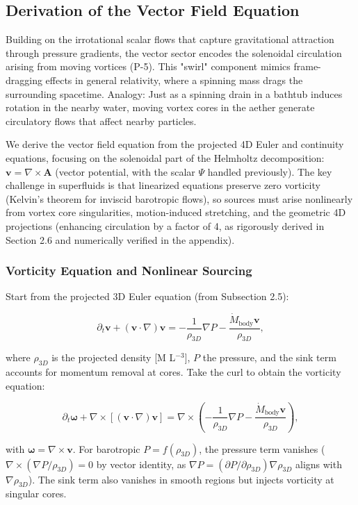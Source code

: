 \subsection{Derivation of the Vector Field Equation}

Building on the irrotational scalar flows that capture gravitational attraction through pressure gradients, the vector sector encodes the solenoidal circulation arising from moving vortices (P-5). This "swirl" component mimics frame-dragging effects in general relativity, where a spinning mass drags the surrounding spacetime. Analogy: Just as a spinning drain in a bathtub induces rotation in the nearby water, moving vortex cores in the aether generate circulatory flows that affect nearby particles.

We derive the vector field equation from the projected 4D Euler and continuity equations, focusing on the solenoidal part of the Helmholtz decomposition: $\mathbf{v} = \nabla \times \mathbf{A}$ (vector potential, with the scalar $\Psi$ handled previously). The key challenge in superfluids is that linearized equations preserve zero vorticity (Kelvin's theorem for inviscid barotropic flows), so sources must arise nonlinearly from vortex core singularities, motion-induced stretching, and the geometric 4D projections (enhancing circulation by a factor of 4, as rigorously derived in Section 2.6 and numerically verified in the appendix).

\subsubsection{Vorticity Equation and Nonlinear Sourcing}

Start from the projected 3D Euler equation (from Subsection 2.5):

\[
\partial_t \mathbf{v} + (\mathbf{v} \cdot \nabla) \mathbf{v} = -\frac{1}{\rho_{3D}} \nabla P - \frac{\dot{M}_{\text{body}} \mathbf{v}}{\rho_{3D}},
\]

where $\rho_{3D}$ is the projected density [M L$^{-3}$], $P$ the pressure, and the sink term accounts for momentum removal at cores. Take the curl to obtain the vorticity equation:

\[
\partial_t \boldsymbol{\omega} + \nabla \times [(\mathbf{v} \cdot \nabla) \mathbf{v}] = \nabla \times \left( -\frac{1}{\rho_{3D}} \nabla P - \frac{\dot{M}_{\text{body}} \mathbf{v}}{\rho_{3D}} \right),
\]

with $\boldsymbol{\omega} = \nabla \times \mathbf{v}$. For barotropic $P = f(\rho_{3D})$, the pressure term vanishes ($\nabla \times (\nabla P / \rho_{3D}) = 0$ by vector identity, as $\nabla P = (\partial P / \partial \rho_{3D}) \nabla \rho_{3D}$ aligns with $\nabla \rho_{3D}$). The sink term also vanishes in smooth regions but injects vorticity at singular cores.


